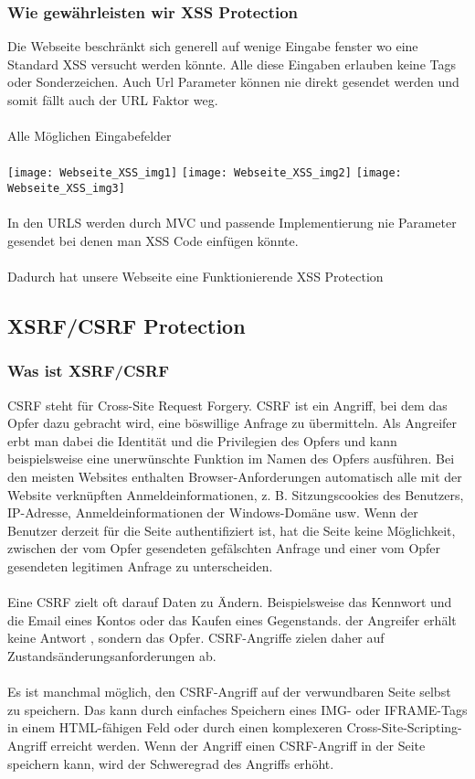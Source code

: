 {\subsubsection{Wie gewährleisten wir XSS Protection}
Die Webseite beschränkt sich generell auf wenige Eingabe fenster wo eine Standard XSS versucht werden könnte. Alle diese Eingaben erlauben keine Tags oder Sonderzeichen. Auch Url Parameter können nie direkt gesendet werden und somit fällt auch der URL Faktor weg.
\\ \\
Alle Möglichen Eingabefelder
\\ \\
\texttt{[image: Webseite\_XSS\_img1]}
\texttt{[image: Webseite\_XSS\_img2]}
\texttt{[image: Webseite\_XSS\_img3]}
\\ \\
In den URLS werden durch MVC und passende Implementierung nie Parameter gesendet bei denen man XSS Code einfügen könnte.\\ \\
Dadurch hat unsere Webseite eine Funktionierende XSS Protection

\subsection{XSRF/CSRF Protection}
\label{sec:csrf}
\subsubsection{Was ist XSRF/CSRF}
CSRF steht für Cross-Site Request Forgery. CSRF ist ein Angriff, bei dem das Opfer dazu gebracht wird, eine böswillige Anfrage zu übermitteln. Als Angreifer erbt man dabei die Identität und die Privilegien des Opfers und kann beispielsweise eine unerwünschte Funktion im Namen des Opfers ausführen. Bei den meisten Websites enthalten Browser-Anforderungen automatisch alle mit der Website verknüpften Anmeldeinformationen, z. B. Sitzungscookies des Benutzers, IP-Adresse, Anmeldeinformationen der Windows-Domäne usw. Wenn der Benutzer derzeit für die Seite authentifiziert ist, hat die Seite keine Möglichkeit, zwischen der vom Opfer gesendeten gefälschten Anfrage und einer vom Opfer gesendeten legitimen Anfrage zu unterscheiden.
\\ \\
Eine CSRF zielt oft darauf Daten zu Ändern. Beispielsweise das Kennwort und die Email eines Kontos oder das Kaufen eines Gegenstands.   der Angreifer erhält keine Antwort , sondern das Opfer. CSRF-Angriffe zielen daher auf Zustandsänderungsanforderungen ab.
\\ \\
Es ist manchmal möglich, den CSRF-Angriff auf der verwundbaren Seite selbst zu speichern. Das kann durch einfaches Speichern eines IMG- oder IFRAME-Tags in einem HTML-fähigen Feld oder durch einen komplexeren Cross-Site-Scripting-Angriff erreicht werden. Wenn der Angriff einen CSRF-Angriff in der Seite speichern kann, wird der Schweregrad des Angriffs erhöht. 

}
